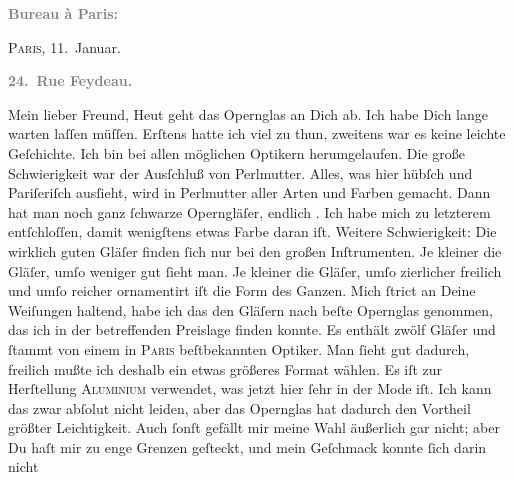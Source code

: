 \begin{ledgroupsized}[t]{13cm}
           \pstart
           \begin{otherlanguage}{french}\textcolor{gray}{\textbf{\textbf{Bureau à Paris:}}}\end{otherlanguage}\hfill \textsc{Paris}, 11. Januar.\pend
           \pstart
           \begin{otherlanguage}{french}\textcolor{gray}{\textbf{\textbf{24. Rue Feydeau.}}}\end{otherlanguage}\pend
           \pstart\center{}Mein lieber Freund,\pend\pstart
           Heut geht das Opernglas an Dich ab. Ich habe Dich
               lange warten laſſen müſſen. Erſtens hatte ich viel zu thun, zweitens war es keine
               leichte Geſchichte. Ich bin bei allen möglichen Optikern herumgelaufen. Die große
               Schwierigkeit war der Ausſchluß von Perlmutter. Alles, was hier hübſch und Pariſeriſch ausſieht, wird in Perlmutter aller
               Arten und Farben gemacht. Dann hat man noch ganz ſchwarze {\pb}Operngläſer, endlich \label{K_L02762-1v}\label{K_L02762-1h}. Ich habe mich zu letzterem entſchloſſen, damit wenigſtens
               etwas Farbe daran iſt. Weitere Schwierigkeit: Die wirklich guten Gläſer finden ſich
               nur bei den großen Inſtrumenten. Je kleiner die Gläſer, umſo weniger gut ſieht man.
               Je kleiner die Gläſer, umſo zierlicher freilich und umſo reicher ornamentirt iſt die
               Form des Ganzen. Mich ſtrict an Deine Weiſungen haltend, habe ich das den Gläſern {\pb}nach beſte Opernglas genommen, das ich in  der betreffenden Preislage finden konnte. Es enthält
               zwölf Gläſer und ſtammt von einem in \textsc{Paris} beſtbekannten Optiker.  Man
               ſieht gut dadurch, freilich mußte ich deshalb ein etwas größeres Format wählen. Es
               iſt zur Herſtellung \textsc{Aluminium} verwendet, was jetzt hier
               ſehr in der Mode iſt. Ich kann das zwar abſolut nicht leiden, aber das Opernglas hat
               dadurch den Vortheil {\pb}größter Leichtigkeit. Auch
               ſonſt gefällt mir meine Wahl äußerlich gar nicht; 
               aber Du haſt mir zu enge Grenzen geſteckt, und mein Geſchmack konnte ſich darin nicht

\end{ledgroupsized}
